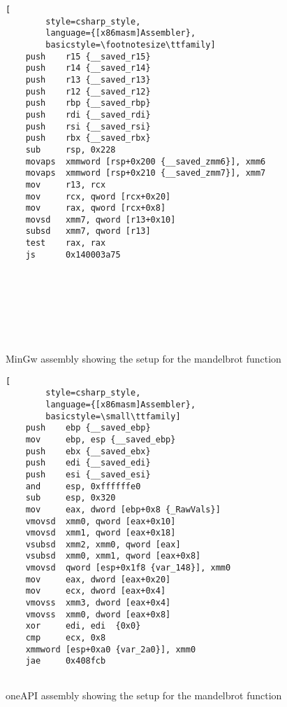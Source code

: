 \begin{figure}[ht]
    \begin{minipage}[b]{0.5\linewidth}
    \begin{lstlisting}[
        style=csharp_style,
        language={[x86masm]Assembler},
        basicstyle=\footnotesize\ttfamily]
    push    r15 {__saved_r15}
    push    r14 {__saved_r14}
    push    r13 {__saved_r13}
    push    r12 {__saved_r12}
    push    rbp {__saved_rbp}
    push    rdi {__saved_rdi}
    push    rsi {__saved_rsi}
    push    rbx {__saved_rbx}
    sub     rsp, 0x228
    movaps  xmmword [rsp+0x200 {__saved_zmm6}], xmm6
    movaps  xmmword [rsp+0x210 {__saved_zmm7}], xmm7
    mov     r13, rcx
    mov     rcx, qword [rcx+0x20]
    mov     rax, qword [rcx+0x8]
    movsd   xmm7, qword [r13+0x10]
    subsd   xmm7, qword [r13]
    test    rax, rax
    js      0x140003a75
        





    
    \end{lstlisting}
    \caption{MinGw assembly showing the setup for the mandelbrot function}
    \label{fig:assembly1}
    \end{minipage}
    \hspace{0.5cm}
    \begin{minipage}[b]{0.5\linewidth}
    \begin{lstlisting}[
        style=csharp_style,
        language={[x86masm]Assembler},
        basicstyle=\small\ttfamily]
    push    ebp {__saved_ebp}
    mov     ebp, esp {__saved_ebp}
    push    ebx {__saved_ebx}
    push    edi {__saved_edi}
    push    esi {__saved_esi}
    and     esp, 0xffffffe0
    sub     esp, 0x320
    mov     eax, dword [ebp+0x8 {_RawVals}]
    vmovsd  xmm0, qword [eax+0x10]
    vmovsd  xmm1, qword [eax+0x18]
    vsubsd  xmm2, xmm0, qword [eax]
    vsubsd  xmm0, xmm1, qword [eax+0x8]
    vmovsd  qword [esp+0x1f8 {var_148}], xmm0
    mov     eax, dword [eax+0x20]
    mov     ecx, dword [eax+0x4]
    vmovss  xmm3, dword [eax+0x4]
    vmovss  xmm0, dword [eax+0x8]
    xor     edi, edi  {0x0}
    cmp     ecx, 0x8
    xmmword [esp+0xa0 {var_2a0}], xmm0
    jae     0x408fcb
        
    \end{lstlisting}
    \caption{oneAPI assembly showing the setup for the mandelbrot function}
    \label{fig:assembly2}
    \end{minipage}
    \end{figure}

